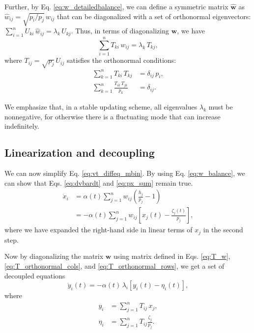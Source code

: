 \documentclass[reprint]{revtex4-1}
\begin{document}
Further, by Eq. \eqref{eq:w_detailedbalance},
we can define a symmetric matrix $\hat{\mathbf w}$
as $\hat w_{ij} = \sqrt{p_i/p_j} \, w_{ij}$
that can be diagonalized
with a set of orthonormal eigenvectors:
%
$\sum_{i = 1}^n U_{ki} \, \hat w_{ij} = \lambda_k \, U_{kj}$.
%
Thus,
in terms of diagonalizing $\mathbf w$, we have
\begin{equation}
  \sum_{i = 1}^n T_{ki} \, w_{ij} = \lambda_k \, T_{kj},
  \label{eq:T_w}
\end{equation}
where
$T_{ij} = \sqrt{p_j} \, U_{ij}$ satisfies
the orthonormal conditions:
%
\begin{align}
\sum_{k = 1}^n T_{ki} \, T_{kj}
&= \delta_{ij} \, p_i,
\label{eq:T_orthonormal_cols}
\\
\sum_{k = 1}^n \frac{ T_{ik} \, T_{jk} }{ p_k }
&= \delta_{ij}.
\label{eq:T_orthonormal_rows}
\end{align}



We emphasize that, in a stable updating scheme,
all eigenvalues $\lambda_k$ must be nonnegative,
for otherwise there is a fluctuating mode
that can increase indefinitely.



\subsection{Linearization and decoupling}



We can now simplify Eq. \eqref{eq:vt_diffeq_mbin}.
%
By using Eq. \eqref{eq:w_balance},
we can show that
Eqs. \eqref{eq:dvbardt} and \eqref{eq:px_sum}
remain true.
%
%
$$
\begin{aligned}
\dot x_i
&= \alpha(t) \sum_{j=1}^n w_{ij}
\left( \frac{ h_j } { p_j }  - 1 \right)
\\
&=
-\alpha(t) \sum_{j = 1}^n
w_{ij} \left[ x_j(t) - \frac{\zeta_j (t)}{p_j} \right],
\end{aligned}
$$
where
we have expanded the right-hand side
in linear terms of $x_j$ in the second step.


Now by diagonalizing the matrix $\mathbf w$
using matrix defined in Eqs. \eqref{eq:T_w},
\eqref{eq:T_orthonormal_cols},
and
\eqref{eq:T_orthonormal_rows},
we get a set of decoupled equations
%
\begin{equation}
\dot y_i(t)
=
-\alpha(t) \, \lambda_i
[y_i(t) - \eta_i(t)],
\label{eq:yt_diffeq}
\end{equation}
%
where
\begin{align}
  y_i &= \sum_{j=1}^n T_{ij} \, x_j,
  \label{eq:y_def}
  \\
  \eta_i &= \sum_{j=1}^n T_{ij} \frac{ \zeta_j}{ p_j}.
  \label{eq:eta_def}
\end{align}
\end{document}
